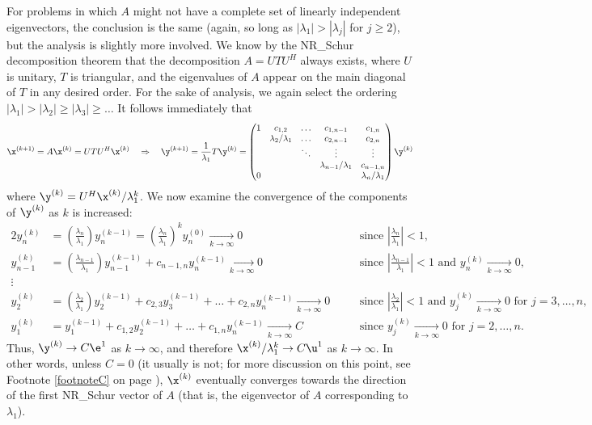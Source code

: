 For problems in which $A$ might not have a complete set of linearly independent eigenvectors, the conclusion is the same (again, so long as
$|\lambda_1|>|\lambda_j|$ for $j\ge 2$), but the analysis is slightly more involved.  We know by the NR_Schur decomposition theorem that
the decomposition $A=UTU^H$ always exists, where $U$ is unitary, $T$ is triangular, and the eigenvalues of $A$ appear on the main diagonal
of $T$ in any desired order.
For the sake of analysis, we again select the ordering $|\lambda_1|>|\lambda_2|\ge|\lambda_3|\ge\ldots$  It follows immediately that
\begin{equation*}
\x^{(k+1)}=A\x^{(k)} = UTU^H \x^{(k)} \quad \Rightarrow \quad \y^{(k+1)}=\frac{1}{\lambda_1} T \y^{(k)} =
\begin{pmatrix} 1 & c_{1,2} & \ldots & c_{1,n-1} & c_{1,n} \\ 
                  & \lambda_2/\lambda_1 & \ldots & c_{2,n-1} & c_{2,n} \\
                  &  & \ddots & \vdots & \vdots \\ 
                  &  &  & \lambda_{n-1}/\lambda_1 & c_{n-1,n} \\ 
                0 &  &  &  & \lambda_n/\lambda_1 \\ \end{pmatrix} \y^{(k)}
\end{equation*} 
where $\y^{(k)}=U^H\x^{(k)}/\lambda^k_1$.  We now examine the convergence of the components of $\y^{(k)}$ as $k$ is increased:
\begin{alignat*}{2}
y_n^{(k)} &= \left(\frac{\lambda_n}{\lambda_1}\right) y_n^{(k-1)}=\left(\frac{\lambda_n}{\lambda_1}\right)^k y_n^{(0)} \xrightarrow[k\rightarrow \infty]{} 0 \quad
&&\textrm{since } \left|\frac{\lambda_n}{\lambda_1}\right|<1, \\
y_{n-1}^{(k)} &= \left(\frac{\lambda_{n-1}}{\lambda_1}\right) y_{n-1}^{(k-1)} + c_{n-1,n} y_{n}^{(k-1)} \xrightarrow[k\rightarrow \infty]{} 0 \quad
&&\textrm{since } \left|\frac{\lambda_{n-1}}{\lambda_1}\right|<1 \textrm{ and } y_n^{(k)} \xrightarrow[k\rightarrow \infty]{} 0,\\
\vdots \\
y_{2}^{(k)} &= \left(\frac{\lambda_{2}}{\lambda_1}\right) y_{2}^{(k-1)} + c_{2,3} y_{3}^{(k-1)}+\ldots+c_{2,n} y_{n}^{(k-1)} \xrightarrow[k\rightarrow \infty]{} 0 \quad
&&\textrm{since } \left|\frac{\lambda_{2}}{\lambda_1}\right|<1 \textrm{ and } y_j^{(k)} \xrightarrow[k\rightarrow \infty]{} 0 \textrm{ for } j=3,\ldots,n,\\
y_{1}^{(k)} &= y_{1}^{(k-1)} + c_{1,2} y_{2}^{(k-1)}+\ldots+c_{1,n} y_{n}^{(k-1)} \xrightarrow[k\rightarrow \infty]{} C \quad
&&\textrm{since } y_j^{(k)} \xrightarrow[k\rightarrow \infty]{} 0 \textrm{ for } j=2,\ldots,n.
\end{alignat*}
Thus, $\y^{(k)}\rightarrow C\e^1$ as $k\rightarrow\infty$, and therefore $\x^{(k)}/\lambda_1^k\rightarrow C\u^1$  as $k\rightarrow\infty$.
In other words, unless $C=0$ (it usually is not; for more discussion on this point, see Footnote \ref{footnoteC} on page \pageref{footnoteC}),
$\x^{(k)}$ eventually converges towards the direction of the first NR_Schur vector of $A$ (that is, the eigenvector of $A$ corresponding to $\lambda_1$).
\vskip0.1in

